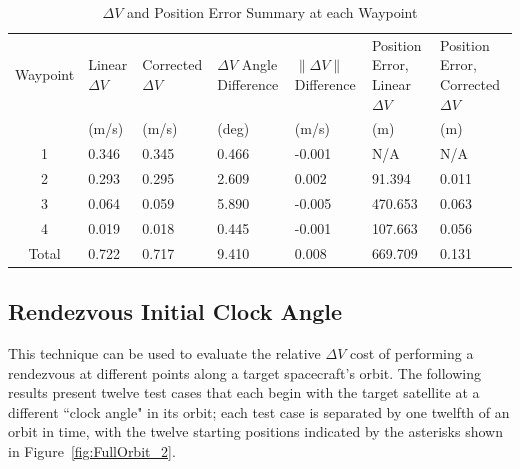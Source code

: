 \documentclass[letterpaper, preprint, paper,11pt]{AAS}	%
\begin{document}
\begin{table}[h] 
	\begin{center}
		\begin{tabular}{c p{0.8 cm} p{1.2 cm} p{1 cm} p{1 cm} p{1.3cm} p{1.3cm}}
			Waypoint   & Linear \(\Delta V\) & Corrected \(\Delta V\) & \(\Delta V\)  \mbox{Angle} Difference & \(\|\Delta V \|\) Difference & Position \mbox{Error}, Linear \(\Delta V\) & Position \mbox{Error}, \mbox{Corrected} \(\Delta V\) \\
			& (m/s) & (m/s) & (deg) & (m/s) & (m) & (m) \\
			1 & 0.346 &	0.345 &	0.466 &	-0.001 &	N/A &	N/A \\
			2 & 0.293 &	0.295 &	2.609 &   0.002 &	91.394 &	0.011 \\
			3 & 0.064 &	0.059 &	5.890 &	-0.005 &	470.653 &	0.063 \\
			4 & 0.019 &	0.018 &	0.445 &	-0.001 &	107.663 &	0.056 \\
			Total & 0.722  & 0.717 & 9.410 & 0.008 & 669.709 & 0.131 \\
		\end{tabular}
		\caption{\(\Delta V\) and Position Error Summary at each Waypoint}
		\label{tab:Results_1}
	\end{center}
\end{table}


\subsection{Rendezvous Initial Clock Angle}

This technique can be used to evaluate the relative \(\Delta V\) cost of performing a rendezvous at different points along a target spacecraft's orbit.  The following results present twelve test cases that each begin with the target satellite at a different ``clock angle" in its orbit; each test case is separated by one twelfth of an orbit in time, with the twelve starting positions indicated by the asterisks shown in Figure~\ref{fig:FullOrbit_2}.
\end{document}
